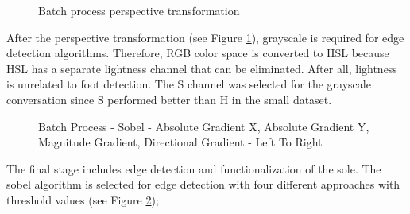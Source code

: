\begin{figure}[htbp]
\centering
{}
\caption{Batch process perspective transformation}
\label{fig:BatchProcessPerspectiveTransformation}
\end{figure}

After the perspective transformation (see Figure \ref{fig:BatchProcessPerspectiveTransformation}), grayscale is required for edge detection algorithms. Therefore, RGB color space is converted to HSL because HSL has a separate lightness channel that can be eliminated. After all, lightness is unrelated to foot detection. The S channel was selected for the grayscale conversation since S performed better than H in the small dataset.

\begin{figure}[htbp]
\centering
{}
\caption{Batch Process - Sobel - Absolute Gradient X, Absolute Gradient Y, Magnitude Gradient, Directional Gradient - Left To Right}
\label{fig:BatchProcessSobelOutput}
\end{figure}

The final stage includes edge detection and functionalization of the sole. The sobel algorithm is selected for edge detection with four different approaches with threshold values (see Figure \ref{fig:BatchProcessSobelOutput});

